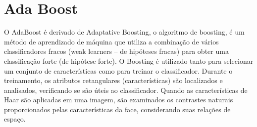 \section{Ada Boost}\label{sec:ada-boost}

O AdaBoost é derivado de Adaptative Boosting, o algoritmo de boosting, é um método de aprendizado de máquina que utiliza a combinação de vários classificadores fracos (weak learners – de hipóteses fracas) para obter uma classificação forte (de hipótese forte). O Boosting é utilizado tanto para selecionar um conjunto de características como para treinar o classificador.
Durante o treinamento, os atributos retangulares (características) são localizados e analisados, verificando se são úteis ao classificador. Quando as características de Haar são aplicadas em uma imagem, são examinados os contrastes naturais proporcionados pelas características da face, considerando suas relações de espaço.

